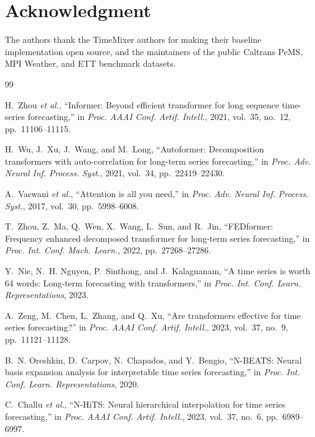 \documentclass[journal]{IEEEtran}
\begin{document}
\section*{Acknowledgment}
The authors thank the TimeMixer authors for making their baseline implementation open source, and the maintainers of the public Caltrans PeMS, MPI Weather, and ETT benchmark datasets.

\begin{thebibliography}{99}

H.~Zhou \textit{et al.}, ``Informer: Beyond efficient transformer for long sequence time-series forecasting,'' in \textit{Proc. AAAI Conf. Artif. Intell.}, 2021, vol.~35, no.~12, pp.~11106--11115.

H.~Wu, J.~Xu, J.~Wang, and M.~Long, ``Autoformer: Decomposition transformers with auto-correlation for long-term series forecasting,'' in \textit{Proc. Adv. Neural Inf. Process. Syst.}, 2021, vol.~34, pp.~22419--22430.

A.~Vaswani \textit{et al.}, ``Attention is all you need,'' in \textit{Proc. Adv. Neural Inf. Process. Syst.}, 2017, vol.~30, pp.~5998--6008.

T.~Zhou, Z.~Ma, Q.~Wen, X.~Wang, L.~Sun, and R.~Jin, ``FEDformer: Frequency enhanced decomposed transformer for long-term series forecasting,'' in \textit{Proc. Int. Conf. Mach. Learn.}, 2022, pp.~27268--27286.

Y.~Nie, N.~H. Nguyen, P.~Sinthong, and J.~Kalagnanam, ``A time series is worth 64 words: Long-term forecasting with transformers,'' in \textit{Proc. Int. Conf. Learn. Representations}, 2023.

A.~Zeng, M.~Chen, L.~Zhang, and Q.~Xu, ``Are transformers effective for time series forecasting?'' in \textit{Proc. AAAI Conf. Artif. Intell.}, 2023, vol.~37, no.~9, pp.~11121--11128.

B.~N. Oreshkin, D.~Carpov, N.~Chapados, and Y.~Bengio, ``N-BEATS: Neural basis expansion analysis for interpretable time series forecasting,'' in \textit{Proc. Int. Conf. Learn. Representations}, 2020.

C.~Challu \textit{et al.}, ``N-HiTS: Neural hierarchical interpolation for time series forecasting,'' in \textit{Proc. AAAI Conf. Artif. Intell.}, 2023, vol.~37, no.~6, pp.~6989--6997.


\end{thebibliography}
\end{document}
